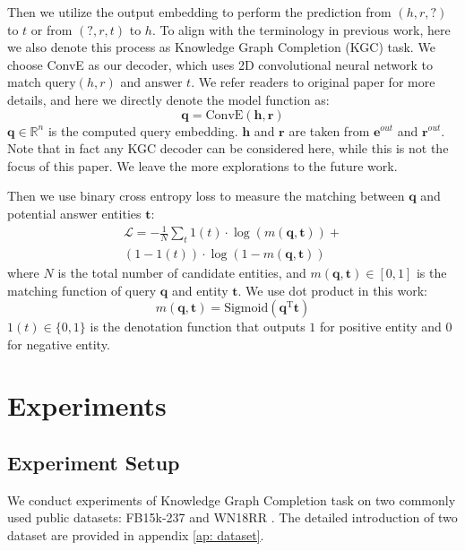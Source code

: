 \documentclass[letterpaper]{article} \usepackage{aaai22}  \usepackage{times}  \usepackage{helvet}  \usepackage{courier}  \usepackage[hyphens]{url}  \usepackage{graphicx} \urlstyle{rm} \def\UrlFont{\rm}  \usepackage{natbib}  \usepackage{caption} \DeclareCaptionStyle{ruled}{labelfont=normalfont,labelsep=colon,strut=off} \frenchspacing  \setlength{\pdfpagewidth}{8.5in}  \setlength{\pdfpageheight}{11in}  \usepackage{algorithm}
\begin{document}
Then we utilize the output embedding to perform the prediction from $(h, r, ?)$ to $t$ or from $(?, r, t) $ to $h$. To align with the terminology in previous work, here we also denote this process as Knowledge Graph Completion (KGC) task. 
We choose ConvE \cite{AAAI_2018_Dettmers_ConvE_WN18RR} as our decoder, which uses 2D convolutional neural network to match $\mathrm{query}(h, r)$ and answer $t$. We refer readers to original paper for more details, and here we directly denote the model function as:
\begin{equation}
    \mathbf{q} = \mathrm{ConvE}(\mathbf{h}, \mathbf{r})
\end{equation} 
$\mathbf{q} \in \mathbb{R}^n$ is the computed query embedding. $\mathbf{h}$ and $\mathbf{r}$ are taken from $\mathbf{e}^{out}$ and $\mathbf{r}^{out}$.
Note that in fact any KGC decoder can be considered here, while this is not the focus of this paper. We leave the more explorations to the future work. 

Then we use binary cross entropy loss to measure the matching between $\mathbf{q}$ and potential answer entities $\mathbf{t}$: 
\begin{equation}
  \begin{aligned}
    \mathcal{L} = -\frac{1}{N} \sum_{t} \mathrm{1}(t) \cdot \log \left(m(\mathbf{q}, \mathbf{t})\right) + \\ 
    (1-\mathrm{1}(t)) \cdot \log (1-m(\mathbf{q}, \mathbf{t}))
  \end{aligned}
\end{equation}
where $N$ is the total number of candidate entities, and $m(\mathbf{q}, \mathbf{t}) \in [0, 1]$ is the matching function of query $\mathbf{q}$ and entity $\mathbf{t}$. We use dot product in this work: 
\begin{equation}
    m(\mathbf{q}, \mathbf{t}) = \mathrm{Sigmoid}(\mathbf{q}^{\mathrm{T}}\mathbf{t})
\end{equation}
$\mathrm{1}(t) \in \{0, 1\}$ is the denotation function that outputs $1$ for positive entity and $0$ for negative entity. 

\section{Experiments}

\subsection{Experiment Setup}
\label{sec: experiment setup}
We conduct experiments of Knowledge Graph Completion task on two commonly used public datasets: FB15k-237 \cite{2015_Toutanova_FB15k-237} and WN18RR \cite{AAAI_2018_Dettmers_ConvE_WN18RR}. The detailed introduction of two dataset are provided in appendix \ref{ap: dataset}.
\end{document}
